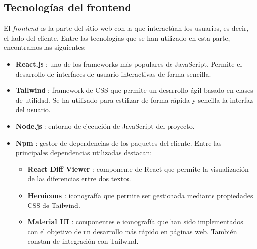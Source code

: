 \subsection{Tecnologías del frontend}

El {\it frontend} es la parte del sitio web con la que interactúan los usuarios, es decir, el lado del cliente. Entre las tecnologías que se han utilizado en esta parte, encontramos las siguientes:

\begin{itemize}
    \item {\bf React.js} \cite{react}: uno de los frameworks más populares de JavaScript. Permite el desarrollo de interfaces de usuario interactivas de forma sencilla.
    \item {\bf Tailwind} \cite{tailwind}: framework de CSS \cite{css} que permite un desarrollo ágil basado en clases de utilidad. Se ha utilizado para estilizar de forma rápida y sencilla la interfaz del usuario.
    \item {\bf Node.js} \cite{nodejs}: entorno de ejecución de JavaScript del proyecto.
    \item {\bf Npm} \cite{npm}: gestor de dependencias de los paquetes del cliente. Entre las principales dependencias utilizadas destacan:
        \begin{itemize}
        \item {\bf React Diff Viewer} \cite{reactdiffviewer}: componente de React que permite la visualización de las diferencias entre dos textos.
        \item {\bf Heroicons} \cite{heroicons}: iconografía que permite ser gestionada mediante propiedades CSS de Tailwind.
        \item {\bf Material UI} \cite{materialui}: componentes e iconografía que han sido implementados con el objetivo de un desarrollo más rápido en páginas web. También constan de integración con Tailwind.
        \end{itemize}
\end{itemize}